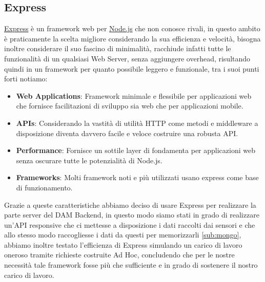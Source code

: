 \documentclass{article}
\newcommand{\node}{\href{https://nodejs.org/it/}{Node.js} }
\newcommand{\express}{\href{https://expressjs.com/it/}{Express} }
\begin{document}
\subsection{Express}
\express è un framework web per \node che non conosce rivali, in questo ambito è praticamente la scelta migliore considerando la sua efficienza e velocità, bisogna inoltre considerare il suo fascino di minimalità, racchiude infatti tutte le funzionalità di un qualsiasi Web Server, senza aggiungere overhead, risultando quindi in un framework per quanto possibile leggero e funzionale, tra i suoi punti forti notiamo:
\begin{itemize}
	\item \textbf{Web Applications}: Framework minimale e flessibile per applicazioni web che fornisce facilitazioni di sviluppo sia web che per applicazioni mobile.
	\item \textbf{APIs}: Considerando la vastità di utilità HTTP come metodi e middleware a disposizione diventa davvero facile e veloce costruire una robusta API.
	\item \textbf{Performance}: Fornisce un sottile layer di fondamenta per applicazioni web senza oscurare tutte le potenzialità di Node.js.
	\item \textbf{Frameworks}: Molti framework noti e più utilizzati usano express come base di funzionamento.
\end{itemize}
Grazie a queste caratteristiche abbiamo deciso di usare Express per realizzare la parte server del DAM Backend, in questo modo siamo stati in grado di realizzare un'API responsive che ci mettesse a disposizione i dati raccolti dai sensori e che allo stesso modo raccogliesse i dati da questi per memorizzarli \ref{sub:mongo}, abbiamo inoltre testato l'efficienza di Express simulando un carico di lavoro oneroso tramite richieste costruite Ad Hoc, concludendo che per le nostre necessità tale framework fosse più che sufficiente e in grado di sostenere il nostro carico di lavoro.
\end{document}
